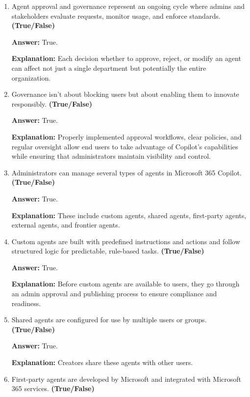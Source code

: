 \documentclass[10pt]{article}
\begin{document}
\begin{enumerate}[leftmargin=*]

\item Agent approval and governance represent an ongoing cycle where admins and stakeholders evaluate requests, monitor usage, and enforce standards. \textbf{(True/False)}

\textbf{Answer:} True.

\textbf{Explanation:} Each decision whether to approve, reject, or modify an agent can affect not just a single department but potentially the entire organization.

\item Governance isn’t about blocking users but about enabling them to innovate responsibly. \textbf{(True/False)}

\textbf{Answer:} True.

\textbf{Explanation:} Properly implemented approval workflows, clear policies, and regular oversight allow end users to take advantage of Copilot’s capabilities while ensuring that administrators maintain visibility and control.

\item Administrators can manage several types of agents in Microsoft 365 Copilot. \textbf{(True/False)}

\textbf{Answer:} True.

\textbf{Explanation:} These include custom agents, shared agents, first-party agents, external agents, and frontier agents.

\item Custom agents are built with predefined instructions and actions and follow structured logic for predictable, rule-based tasks. \textbf{(True/False)}

\textbf{Answer:} True.

\textbf{Explanation:} Before custom agents are available to users, they go through an admin approval and publishing process to ensure compliance and readiness.

\item Shared agents are configured for use by multiple users or groups. \textbf{(True/False)}

\textbf{Answer:} True.

\textbf{Explanation:} Creators share these agents with other users.

\item First-party agents are developed by Microsoft and integrated with Microsoft 365 services. \textbf{(True/False)}


\end{enumerate}
\end{document}
